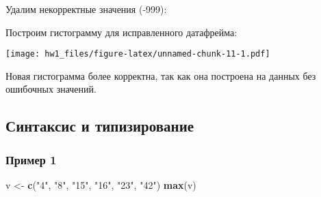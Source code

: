 \documentclass[
]{article}
\newenvironment{Shaded}{\begin{snugshade}}{\end{snugshade}}
\newcommand{\AttributeTok}[1]{\textcolor[rgb]{0.13,0.29,0.53}{#1}}
\newcommand{\DecValTok}[1]{\textcolor[rgb]{0.00,0.00,0.81}{#1}}
\newcommand{\FunctionTok}[1]{\textcolor[rgb]{0.13,0.29,0.53}{\textbf{#1}}}
\newcommand{\NormalTok}[1]{#1}
\newcommand{\OtherTok}[1]{\textcolor[rgb]{0.56,0.35,0.01}{#1}}
\newcommand{\SpecialCharTok}[1]{\textcolor[rgb]{0.81,0.36,0.00}{\textbf{#1}}}
\newcommand{\StringTok}[1]{\textcolor[rgb]{0.31,0.60,0.02}{#1}}
\begin{document}
Удалим некорректные значения (-999):

\begin{Shaded}
\end{Shaded}

Построим гистограмму для исправленного датафрейма:

\begin{Shaded}
\end{Shaded}

\texttt{[image: hw1\_files/figure-latex/unnamed-chunk-11-1.pdf]}

Новая гистограмма более корректна, так как она построена на данных без
ошибочных значений.

\subsection{Синтаксис и
типизирование}\label{ux441ux438ux43dux442ux430ux43aux441ux438ux441-ux438-ux442ux438ux43fux438ux437ux438ux440ux43eux432ux430ux43dux438ux435}

\subsubsection{Пример 1}\label{ux43fux440ux438ux43cux435ux440-1}

\begin{Shaded}
\begin{Highlighting}[]
\NormalTok{v }\OtherTok{\textless{}{-}} \FunctionTok{c}\NormalTok{(}\StringTok{"4"}\NormalTok{, }\StringTok{"8"}\NormalTok{, }\StringTok{"15"}\NormalTok{, }\StringTok{"16"}\NormalTok{, }\StringTok{"23"}\NormalTok{, }\StringTok{"42"}\NormalTok{)}
\FunctionTok{max}\NormalTok{(v)}
\end{Highlighting}
\end{Shaded}
\end{document}
